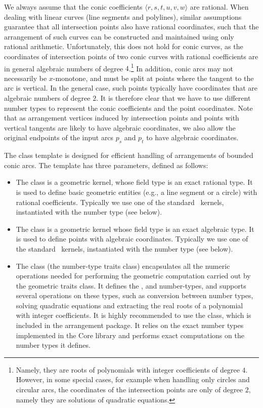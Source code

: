 We always assume that the conic coefficients $\langle r, s,
t, u, v, w \rangle$ are rational. When dealing with linear curves
(line segments and polylines), similar assumptions guarantee that
all intersection points also have rational coordinates, such that
the arrangement of such curves can be constructed and maintained
using only rational arithmetic. Unfortunately, this does not hold
for conic curves, as the coordinates of intersection points of two
conic curves with rational coefficients are in general algebraic
numbers of degree $4$.\footnote{Namely, they are roots of
polynomials with integer coefficients of degree $4$. However, in
some special cases, for example when handling only circles and
circular arcs, the coordinates of the intersection points are only
of degree $2$, namely they are solutions of quadratic equations.}
In addition, conic arcs may not necessarily be $x$-monotone, and
must be split at points where the tangent to the arc is vertical.
In the general case, such points typically have coordinates that
are algebraic numbers of degree $2$.
It is therefore clear that we have to use different number types
to represent the conic coefficients and the point coordinates.
Note that as arrangement vertices induced by intersection points
and points with vertical tangents are likely to have algebraic
coordinates, we also allow the original endpoints of the input arcs
$p_s$ and $p_t$ to have algebraic coordinates.

The  class
template is designed for efficient handling of arrangements of
bounded conic arcs. The template has three parameters, defined as
follows:
\begin{itemize}
\item The  class is a geometric kernel, whose field
type is an exact rational type. It is used to define basic
geometric entities (e.g., a line segment or a circle) with rational
coefficients. Typically we use one of the standard \cgal\ kernels,
instantiated with the number type  (see
below).
%
\item The  class is a geometric kernel whose field
type is an exact algebraic type. It is used to define points with
algebraic coordinates. Typically we use one of the standard
\cgal\ kernels, instantiated with the number type
 (see below).
%
\item The  class (the number-type traits class)
encapsulates all the numeric operations needed for performing the
geometric computation carried out by the geometric traits class.
It defines the ,  and 
number-types, and supports several operations on these types, such
as conversion between number types, solving quadratic equations
and extracting the real roots of a polynomial with integer
coefficients. It is highly recommended to use the
 class, which is included in the
arrangement package. It relies on the exact number types
implemented in the {\sc Core} library and performs exact
computations on the number types it defines.
\end{itemize}

